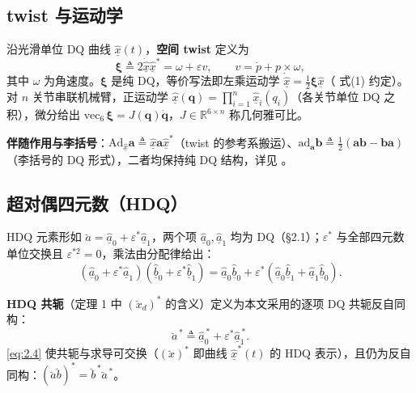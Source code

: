 \subsection{twist 与运动学}

沿光滑单位 DQ 曲线 $\hat{\underline x}(t)$，\textbf{空间 twist} 定义为
\begin{equation}
\boldsymbol\xi\triangleq 2\dot{\hat{\underline x}}\hat{\underline x}^{*}=\omega+\varepsilon v,\qquad v=\dot p+p\times\omega,
\tag{2.2}\label{eq:2.2}
\end{equation}
其中 $\omega$ 为角速度。$\boldsymbol\xi$ 是纯 DQ，等价写法即左乘运动学 $\dot{\hat{\underline x}}=\tfrac12\boldsymbol\xi\hat{\underline x}$（\cite{P2} 式(1) 约定）。对 $n$ 关节串联机械臂，正运动学 $\hat{\underline x}(\boldsymbol q)=\prod_{i=1}^n\hat{\underline x}_i(q_i)$（各关节单位 DQ 之积），微分给出 $\mathrm{vec}_6\,\boldsymbol\xi=J(\boldsymbol q)\dot{\boldsymbol q}$，$J\in\mathbb R^{6\times n}$ 称几何雅可比。

\textbf{伴随作用与李括号}：$\mathrm{Ad}_{\hat{\underline x}}\boldsymbol a\triangleq\hat{\underline x}\boldsymbol a\hat{\underline x}^*$（twist 的参考系搬运）、$\mathrm{ad}_{\boldsymbol a}\boldsymbol b\triangleq\tfrac12(\boldsymbol{ab}-\boldsymbol{ba})$（李括号的 DQ 形式），二者均保持纯 DQ 结构，详见 \cite{Lynch17}。

\subsection{超对偶四元数（HDQ）}

HDQ 元素形如 $\breve a=\hat{\underline a}_0+\varepsilon^*\hat{\underline a}_1$，两个项 $\hat{\underline a}_0,\hat{\underline a}_1$ 均为 DQ（§2.1）；$\varepsilon^*$ 与全部四元数单位交换且 $\varepsilon^{*2}=0$，乘法由分配律给出：
\begin{equation}
(\hat{\underline a}_0+\varepsilon^*\hat{\underline a}_1)(\hat{\underline b}_0+\varepsilon^*\hat{\underline b}_1)=\hat{\underline a}_0\hat{\underline b}_0+\varepsilon^*(\hat{\underline a}_0\hat{\underline b}_1+\hat{\underline a}_1\hat{\underline b}_0).
\tag{2.3}\label{eq:2.3}
\end{equation}

\textbf{HDQ 共轭}（定理 1 中 $(\breve x_d)^*$ 的含义）定义为本文采用的逐项 DQ 共轭反自同构：
\begin{equation}
\breve a^{\,*}\triangleq\hat{\underline a}_0^{\,*}+\varepsilon^*\hat{\underline a}_1^{\,*}.
\tag{2.4}\label{eq:2.4}
\end{equation}
\eqref{eq:2.4} 使共轭与求导可交换（$ (\breve x)^* $ 即曲线 $\hat{\underline x}^*(t)$ 的 HDQ 表示），且仍为反自同构：$ (\breve a\breve b)^*=\breve b^{\,*}\breve a^{\,*} $。
